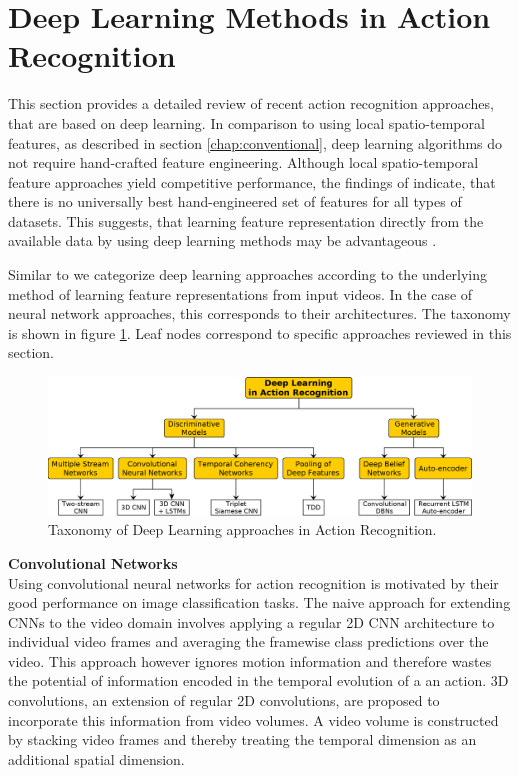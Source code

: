 \section{Deep Learning Methods in Action Recognition}
\label{sec:deep}
This section provides a detailed review of recent action recognition approaches, that are based on deep learning.
In comparison to using local spatio-temporal features, as described in section \ref{chap:conventional}, deep learning algorithms do not require hand-crafted feature engineering.
Although local spatio-temporal feature approaches yield competitive performance, the findings of \textcite{wang_evaluation_2009} indicate, that there is no universally best hand-engineered set of features for all types of datasets.
This suggests, that learning feature representation directly from the available data by using deep learning methods may be advantageous \cite{le_learning_2011}.

Similar to \cite{herath_going_2016} we categorize deep learning approaches according to the underlying method of learning feature representations from input videos.
In the case of neural network approaches, this corresponds to their architectures.
The taxonomy is shown in figure \ref{fig:deep_taxonomy}.
Leaf nodes correspond to specific approaches reviewed in this section.

\begin{figure}[H]
    \centering
    \includegraphics[width=\textwidth]{img_deep/deep_taxonomy}
    \caption{Taxonomy of Deep Learning approaches in Action Recognition.}
    \label{fig:deep_taxonomy}
\end{figure}

\textbf{Convolutional Networks}\\
Using convolutional neural networks for action recognition is motivated by their good performance on image classification tasks.
The naive approach for extending CNNs to the video domain involves applying a regular 2D CNN architecture to individual video frames and averaging the framewise class predictions over the video.
This approach however ignores motion information and therefore wastes the potential of information encoded in the temporal evolution of a an action.
3D convolutions, an extension of regular 2D convolutions, are proposed to incorporate this information from video volumes.
A video volume is constructed by stacking video frames and thereby treating the temporal dimension as an additional spatial dimension.

